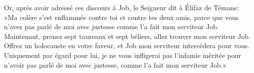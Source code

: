 Or, après avoir adressé ces discours à Job, le Seigneur dit à Élifaz de Témane:
	«Ma colère s’est enflammée contre toi et contre tes deux amis,
	parce que vous n’avez pas parlé de moi avec justesse comme l’a fait mon serviteur Job.
Maintenant, prenez sept taureaux et sept béliers, allez trouver mon serviteur Job.
Offrez un holocauste en votre faveur, et Job mon serviteur intercédera pour vous.
Uniquement par égard pour lui, je ne vous infligerai pas l’infamie méritée
	pour n’avoir pas parlé de moi avec justesse, comme l’a fait mon serviteur Job.»
